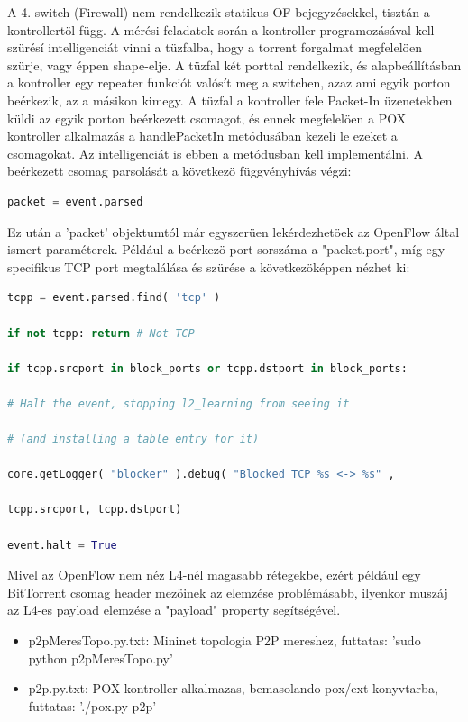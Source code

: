 \documentclass[a4paper]{article}
\begin{document}
A 4. switch (Firewall) nem rendelkezik statikus OF bejegyzésekkel, tisztán a kontrollertöl függ. A mérési feladatok során a kontroller programozásával kell szürésí intelligenciát vinni a tüzfalba, hogy a torrent forgalmat megfelelöen szürje, vagy éppen shape-elje. A tüzfal két porttal rendelkezik, és alapbeállításban a kontroller egy repeater funkciót valósít meg a switchen, azaz ami egyik porton beérkezik, az a másikon kimegy. A tüzfal a kontroller fele Packet-In üzenetekben küldi az egyik porton beérkezett csomagot, és ennek megfelelöen a POX kontroller alkalmazás a handlePacketIn metódusában kezeli le ezeket a csomagokat. Az intelligenciát is ebben a metódusban kell implementálni. A beérkezett csomag parsolását a következö függvényhívás végzi: 
\begin{lstlisting}[language=python,frame=single,breaklines]
packet = event.parsed  
\end{lstlisting}

Ez után a 'packet' objektumtól már egyszerüen lekérdezhetöek az OpenFlow által ismert paraméterek. Például a beérkezö port sorszáma a "packet.port", míg egy specifikus TCP port megtalálása és szürése a következöképpen nézhet ki: 

\begin{lstlisting}[language=python,frame=single,breaklines]
tcpp = event.parsed.find( 'tcp' )

if not tcpp: return # Not TCP

if tcpp.srcport in block_ports or tcpp.dstport in block_ports:

# Halt the event, stopping l2_learning from seeing it

# (and installing a table entry for it)

core.getLogger( "blocker" ).debug( "Blocked TCP %s <-> %s" ,

tcpp.srcport, tcpp.dstport)

event.halt = True
\end{lstlisting}

Mivel az OpenFlow nem néz L4-nél magasabb rétegekbe, ezért például egy BitTorrent csomag header mezöinek az elemzése problémásabb, ilyenkor muszáj az L4-es payload elemzése a "payload" property segítségével. 

\appendix

\begin{itemize}

    \item p2pMeresTopo.py.txt: Mininet topologia P2P mereshez, futtatas: 'sudo python p2pMeresTopo.py' 

    \item p2p.py.txt: POX kontroller alkalmazas, bemasolando pox/ext konyvtarba, futtatas: './pox.py p2p' 
\end{itemize}
\end{document}
